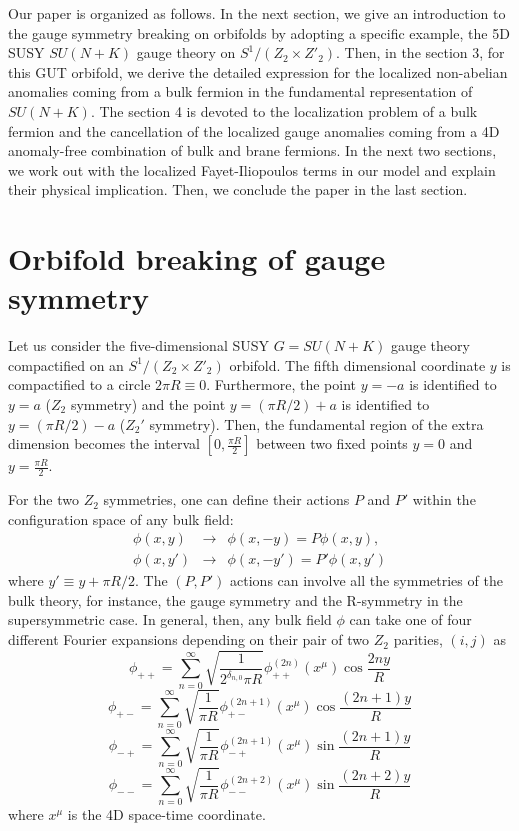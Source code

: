 \documentclass[a4paper,12pt]{article}
\begin{document}
Our paper is organized as follows. In the next section, we give an introduction
to the gauge symmetry breaking on orbifolds by adopting a specific example, 
the 5D SUSY $SU(N+K)$ gauge theory on $S^1/(Z_2\times Z'_2)$.
Then, in the section 3, for this GUT orbifold, 
we derive the detailed expression for the localized non-abelian anomalies
coming from a bulk fermion in the fundamental representation of $SU(N+K)$. 
The section 4 is devoted to the localization problem of a bulk fermion and the
cancellation of the localized gauge anomalies coming from a 4D anomaly-free 
combination of bulk and brane fermions. In the next two sections, 
we work out with 
the localized Fayet-Iliopoulos terms in our model 
and explain their physical implication.
Then, we conclude the paper in the last section. 


\section{Orbifold breaking of gauge symmetry}

Let us consider the five-dimensional SUSY $G=SU(N+K)$ gauge theory 
compactified
on an $S^1/(Z_2\times Z'_2)$ orbifold.
The fifth dimensional coordinate $y$ is compactified to a circle
$2\pi R\equiv 0$. Furthermore, the point $y=-a$ is identified to
$y=a$ ($Z_2$ symmetry) and the point $y=(\pi R/2)+a$ is identified
to $y=(\pi R/2)-a$ ($Z_2'$ symmetry).
Then, the fundamental region of
the extra dimension becomes the interval $[0,\frac{\pi R}{2}]$
between two fixed points $y=0$ and $y=\frac{\pi R}{2}$.

For the two $Z_2$ symmetries, one can define their actions $P$ and $P'$
within the configuration space of any bulk field:
\begin{eqnarray}
\phi(x,y)&\rightarrow& \phi(x,-y)=P\phi(x,y), \\
\phi(x,y')&\rightarrow& \phi(x,-y')=P'\phi(x,y')
\end{eqnarray}
where $y'\equiv y+\pi R/2$.
The $(P,P')$ actions can involve all the symmetries
of the bulk theory, for instance, the gauge symmetry and the R-symmetry
in the supersymmetric case.
In general, then, any bulk field $\phi$
can take one of four different Fourier expansions depending on their
pair of two $Z_2$ parities, $(i,j)$ as
\begin{equation}
\phi_{++}=\sum^\infty_{n=0}\sqrt{\frac{1}{2^{\delta_{n,0}}\pi R}}
\phi^{(2n)}_{++}(x^\mu)\cos\frac{2ny}{R}\label{mode1}
\end{equation}
\begin{equation}
\phi_{+-}=\sum^\infty_{n=0}\sqrt{\frac{1}{\pi R}}
\phi^{(2n+1)}_{+-}(x^\mu)\cos\frac{(2n+1)y}{R}\label{mode2}
\end{equation}
\begin{equation}
 \phi_{-+}=\sum^\infty_{n=0}\sqrt{\frac{1}{\pi R}}
\phi^{(2n+1)}_{-+}(x^\mu)\sin\frac{(2n+1)y}{R}\label{mode3}
\end{equation}
\begin{equation}
\phi_{--}=\sum^\infty_{n=0}\sqrt{\frac{1}{\pi R}}
\phi^{(2n+2)}_{--}(x^\mu)\sin\frac{(2n+2)y}{R}\label{mode4}
\end{equation}
where $x^\mu$ is the 4D space-time coordinate.
\end{document}
